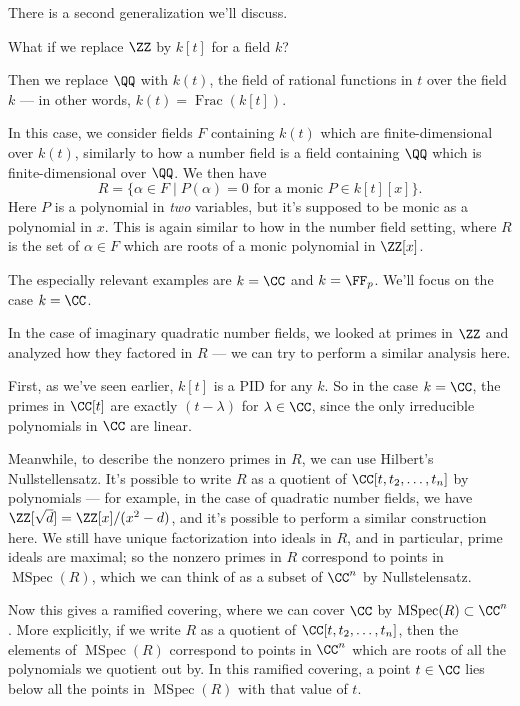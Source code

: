 There is a second generalization we'll discuss. 

\begin{qq}
What if we replace $\ZZ$ by $k[t]$ for a field $k$?
\end{qq}

Then we replace $\QQ$ with $k(t)$, the field of rational functions in $t$ over the field $k$ --- in other words, $k(t) = \operatorname{Frac}(k[t])$. 

In this case, we consider fields $F$ containing $k(t)$ which are finite-dimensional over $k(t)$, similarly to how a number field is a field containing $\QQ$ which is finite-dimensional over $\QQ$. We then have \[R = \{\alpha \in F \mid P(\alpha) = 0 \text{ for a monic $P \in k[t][x]$}\}.\] Here $P$ is a polynomial in \emph{two} variables, but it's supposed to be monic as a polynomial in $x$. This is again similar to how in the number field setting, where $R$ is the set of $\alpha \in F$ which are roots of a monic polynomial in $\ZZ[x]$.

The especially relevant examples are $k = \CC$ and $k = \FF_p$. We'll focus on the case $k = \CC$. 

In the case of imaginary quadratic number fields, we looked at primes in $\ZZ$ and analyzed how they factored in $R$ --- we can try to perform a similar analysis here. 

First, as we've seen earlier, $k[t]$ is a PID for any $k$. So in the case $k = \CC$, the primes in $\CC[t]$ are exactly $(t - \lambda)$ for $\lambda \in \CC$, since the only irreducible polynomials in $\CC$ are linear. 

Meanwhile, to describe the nonzero primes in $R$, we can use Hilbert's Nullstellensatz. It's possible to write $R$ as a quotient of $\CC[t, t_2, \ldots, t_n]$ by polynomials --- for example, in the case of quadratic number fields, we have $\ZZ[\sqrt{d}] = \ZZ[x]/(x^2 - d)$, and it's possible to perform a similar construction here. We still have unique factorization into ideals in $R$, and in particular, prime ideals are maximal; so the nonzero primes in $R$ correspond to points in $\operatorname{MSpec}(R)$, which we can think of as a subset of $\CC^n$ by Nullstelensatz.

Now this gives a ramified covering, where we can cover $\CC$ by $\operatorname{MSpec}(R) \subset \CC^n$. More explicitly, if we write $R$ as a quotient of $\CC[t, t_2, \ldots, t_n]$, then the elements of $\operatorname{MSpec}(R)$ correspond to points in $\CC^n$ which are roots of all the polynomials we quotient out by. In this ramified covering, a point $t \in \CC$ lies below all the points in $\operatorname{MSpec}(R)$ with that value of $t$.


